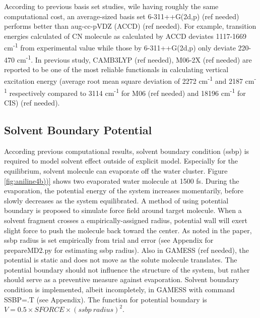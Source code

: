 \documentclass[
journal=jpcbfk, %
manuscript=article]{achemso}
\begin{document}
According to previous basis set studies, wile having roughly the same computational cost, an average-sized basis set 6-311++G(2d,p)  (ref needed) performs better than aug-cc-pVDZ (ACCD) (ref needed).\cite{Wiberg2004,Barnes2014} For example, transition energies calculated of CN molecule as calculated by ACCD deviates 1117-1669 cm\textsuperscript{-1} from experimental value while those by 6-311++G(2d,p) only deviate 220-470 cm\textsuperscript{-1}. In previous study, CAMB3LYP (ref needed), M06-2X (ref needed) are reported to be one of the most reliable functionals in calculating vertical excitation energy (average root mean square deviation of 2272 cm\textsuperscript{-1}  and 2187 cm\textsuperscript{-1}  respectively compared to 3114 cm\textsuperscript{-1} for M06 (ref needed) and 18196 cm\textsuperscript{-1} for CIS) (ref needed).\cite{Barnes2014} 

\subsection{Solvent Boundary Potential}
According previous computational results, solvent boundary condition (ssbp) is required to model solvent effect outside of explicit model. Especially for the equilibrium, solvent molecule can evaporate off the water cluster. Figure \ref{fig:aniline4b))} shows two evaporated water molecule at 1500 fs. During the evaporation, the potential energy of the system increases momentarily, before slowly decreases as the system equilibrated. A method of using potential boundary is proposed to simulate force field around target molecule. When a solvent fragment crosses a empirically-assigned radius, potential wall will exert slight force to push the molecule back toward the center.\cite{Beglov1994} As noted in the paper, ssbp radius is set empirically from trial and error (see Appendix for prepareMD2.py for estimating ssbp radius). Also in GAMESS (ref needed), the potential is static and does not move as the solute molecule translates. The potential boundary should not influence the structure of the system, but rather should serve as a preventive measure against evaporation. Solvent boundary condition is implemented, albeit incompletely, in GAMESS with command SSBP=.T (see Appendix). The function for potential boundary is \(V=0.5\times SFORCE\times (ssbp\ radius)^{2}\).
\end{document}
